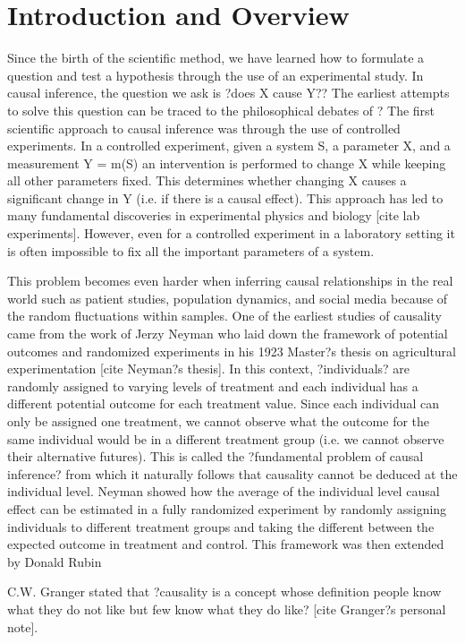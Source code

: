 \documentclass[]{article}
\begin{document}
\section{Introduction and Overview}
Since the birth of the scientific method, we have learned how to formulate a question and test a hypothesis through the use of an experimental study. In causal inference, the question we ask is ?does X cause Y?? The earliest attempts to solve this question can be traced to the philosophical debates of ? The first scientific approach to causal inference was through the use of controlled experiments. In a controlled experiment, given a system S, a parameter X, and a measurement Y = m(S) an intervention is performed to change X while keeping all other parameters fixed. This determines whether changing X causes a significant change in Y (i.e. if there is a causal effect). This approach has led to many fundamental discoveries in experimental physics and biology [cite lab experiments]. However, even for a controlled experiment in a laboratory setting it is often impossible to fix all the important parameters of a system. 

This problem becomes even harder when inferring causal relationships in the real world such as patient studies, population dynamics, and social media because of the random fluctuations within samples. One of the earliest studies of causality came from the work of Jerzy Neyman who laid down the framework of potential outcomes and randomized experiments in his 1923 Master?s thesis on agricultural experimentation [cite Neyman?s thesis]. In this context, ?individuals? are randomly assigned to varying levels of treatment and each individual has a different potential outcome for each treatment value. Since each individual can only be assigned one treatment, we cannot observe what the outcome for the same individual would be in a different treatment group (i.e. we cannot observe their alternative futures). This is called the ?fundamental problem of causal inference? from which it naturally follows that causality cannot be deduced at the individual level. Neyman showed how the average of the individual level causal effect can be estimated in a fully randomized experiment by randomly assigning individuals to different treatment groups and taking the different between the expected outcome in treatment and control. This framework was then extended by Donald Rubin 

C.W. Granger stated that ?causality is a concept whose definition people know what they do not like but few know what they do like? [cite Granger?s personal note].
\end{document}
